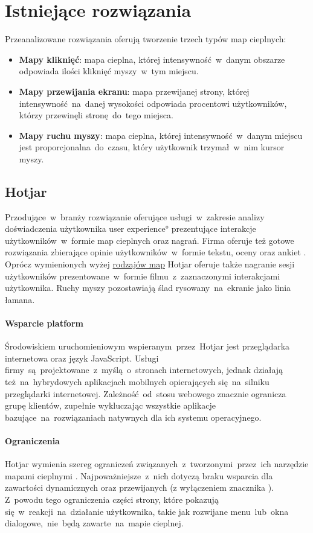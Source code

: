\section{Istniejące rozwiązania}
\label{par:heat_map_types}

\noindent Przeanalizowane rozwiązania oferują tworzenie trzech typów map cieplnych:

\begin{itemize}
	\item {\bf Mapy kliknięć}: mapa cieplna, której intensywność~w~danym obszarze odpowiada ilości kliknięć myszy~w~tym miejscu.
	\item {\bf Mapy przewijania ekranu}: mapa przewijanej strony, której intensywność~na~danej wysokości odpowiada procentowi użytkowników, którzy przewinęli stronę~do~tego miejsca.
	\item {\bf Mapy ruchu myszy}: mapa cieplna, której intensywność~w~danym miejscu jest proporcjonalna~do~czasu, który użytkownik trzymał~w~nim kursor myszy.
\end{itemize}

\subsection{Hotjar}
Przodujące~w~branży rozwiązanie oferujące usługi~w~zakresie analizy doświadczenia użytkownika \ang{user experience} prezentujące interakcje użytkowników~w~formie map cieplnych oraz nagrań. Firma oferuje też gotowe rozwiązania zbierające opinie użytkowników~w~formie tekstu, oceny oraz ankiet \cite{Hotjar_website}. Oprócz wymienionych wyżej \hyperref[{par:heat_map_types}]{rodzajów map} Hotjar oferuje także nagranie sesji użytkowników prezentowane~w~formie filmu~z~zaznaczonymi interakcjami użytkownika. Ruchy myszy pozostawiają ślad rysowany~na~ekranie jako linia łamana.

\paragraph{Wsparcie platform} 
Środowiskiem uruchomieniowym wspieranym~przez~Hotjar jest przeglądarka internetowa oraz język JavaScript. Usługi firmy~są~projektowane~z~myślą~o~stronach internetowych, jednak działają też~na~hybrydowych aplikacjach mobilnych opierających się~na~silniku przeglądarki internetowej. Zależność~od~stosu webowego znacznie ogranicza grupę klientów, zupełnie wykluczając wszystkie aplikacje bazujące~na~rozwiązaniach natywnych dla ich systemu operacyjnego.

\paragraph{Ograniczenia} 
Hotjar wymienia szereg ograniczeń związanych~z~tworzonymi~przez~ich narzędzie mapami cieplnymi \cite{Hotjar_limitations}. Najpoważniejsze~z~nich dotyczą braku wsparcia dla zawartości dynamicznych oraz przewijanych (z wyłączeniem znacznika ). Z~powodu tego ograniczenia części strony, które pokazują się~w~reakcji~na~działanie użytkownika, takie jak rozwijane menu~lub~okna dialogowe,~nie~będą zawarte~na~mapie cieplnej.

